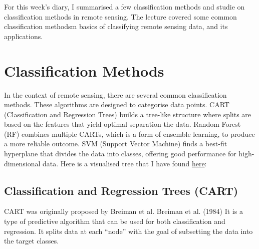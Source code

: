 \documentclass[
  letterpaper,
  DIV=11,
  numbers=noendperiod]{scrreprt}
\begin{document}

For this week's diary, I summarised a few classification methods and
studie on classification methods in remote sensing. The lecture covered
some common classification methodsm basics of classifying remote sensing
data, and its applications.

\hypertarget{classification-methods}{%
\section*{Classification Methods}\label{classification-methods}}


In the context of remote sensing, there are several common
classification methods. These algorithms are designed to categorise data
points. CART (Classification and Regression Trees) builds a tree-like
structure where splits are based on the features that yield optimal
separation the data. Random Forest (RF) combines multiple CARTs, which
is a form of ensemble learning, to produce a more reliable outcome. SVM
(Support Vector Machine) finds a best-fit hyperplane that divides the
data into classes, offering good performance for high-dimensional data.
Here is a visualised tree that I have found
\href{https://wiki.q-researchsoftware.com/wiki/Machine_Learning_-_Classification_And_Regression_Trees_(CART)}{here}:

\hypertarget{classification-and-regression-trees-cart}{%
\subsection*{Classification and Regression Trees
(CART)}\label{classification-and-regression-trees-cart}}

CART was originally proposed by Breiman et al. Breiman et al. (1984) It
is a type of predictive algorithm that can be used for both
classification and regression. It splits data at each ``node'' with the
goal of subsetting the data into the target classes.
\end{document}

